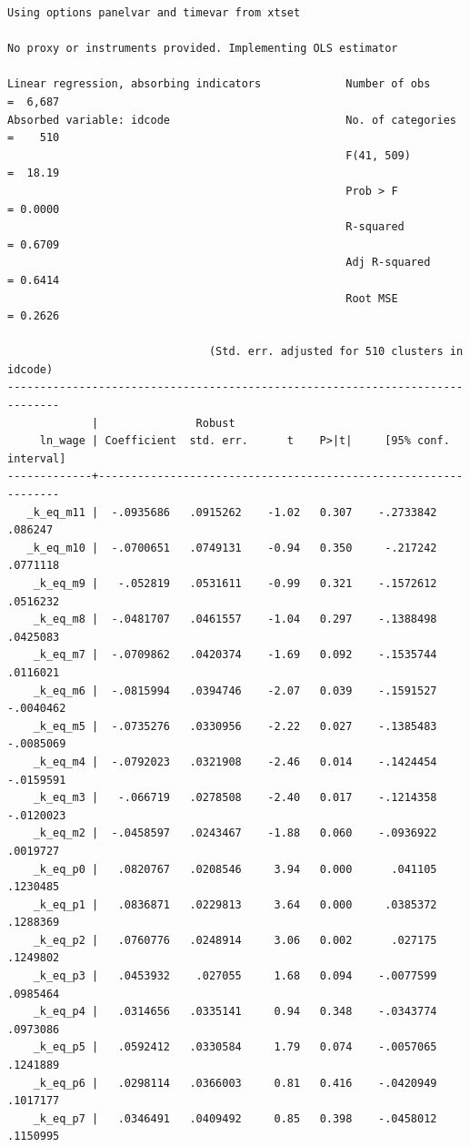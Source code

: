 \documentclass[
]{book}
\begin{document}
\begin{verbatim}
Using options panelvar and timevar from xtset

No proxy or instruments provided. Implementing OLS estimator

Linear regression, absorbing indicators             Number of obs     =  6,687
Absorbed variable: idcode                           No. of categories =    510
                                                    F(41, 509)        =  18.19
                                                    Prob > F          = 0.0000
                                                    R-squared         = 0.6709
                                                    Adj R-squared     = 0.6414
                                                    Root MSE          = 0.2626

                               (Std. err. adjusted for 510 clusters in idcode)
------------------------------------------------------------------------------
             |               Robust
     ln_wage | Coefficient  std. err.      t    P>|t|     [95% conf. interval]
-------------+----------------------------------------------------------------
   _k_eq_m11 |  -.0935686   .0915262    -1.02   0.307    -.2733842     .086247
   _k_eq_m10 |  -.0700651   .0749131    -0.94   0.350     -.217242    .0771118
    _k_eq_m9 |   -.052819   .0531611    -0.99   0.321    -.1572612    .0516232
    _k_eq_m8 |  -.0481707   .0461557    -1.04   0.297    -.1388498    .0425083
    _k_eq_m7 |  -.0709862   .0420374    -1.69   0.092    -.1535744    .0116021
    _k_eq_m6 |  -.0815994   .0394746    -2.07   0.039    -.1591527   -.0040462
    _k_eq_m5 |  -.0735276   .0330956    -2.22   0.027    -.1385483   -.0085069
    _k_eq_m4 |  -.0792023   .0321908    -2.46   0.014    -.1424454   -.0159591
    _k_eq_m3 |   -.066719   .0278508    -2.40   0.017    -.1214358   -.0120023
    _k_eq_m2 |  -.0458597   .0243467    -1.88   0.060    -.0936922    .0019727
    _k_eq_p0 |   .0820767   .0208546     3.94   0.000      .041105    .1230485
    _k_eq_p1 |   .0836871   .0229813     3.64   0.000     .0385372    .1288369
    _k_eq_p2 |   .0760776   .0248914     3.06   0.002      .027175    .1249802
    _k_eq_p3 |   .0453932    .027055     1.68   0.094    -.0077599    .0985464
    _k_eq_p4 |   .0314656   .0335141     0.94   0.348    -.0343774    .0973086
    _k_eq_p5 |   .0592412   .0330584     1.79   0.074    -.0057065    .1241889
    _k_eq_p6 |   .0298114   .0366003     0.81   0.416    -.0420949    .1017177
    _k_eq_p7 |   .0346491   .0409492     0.85   0.398    -.0458012    .1150995

\end{verbatim}
\end{document}

